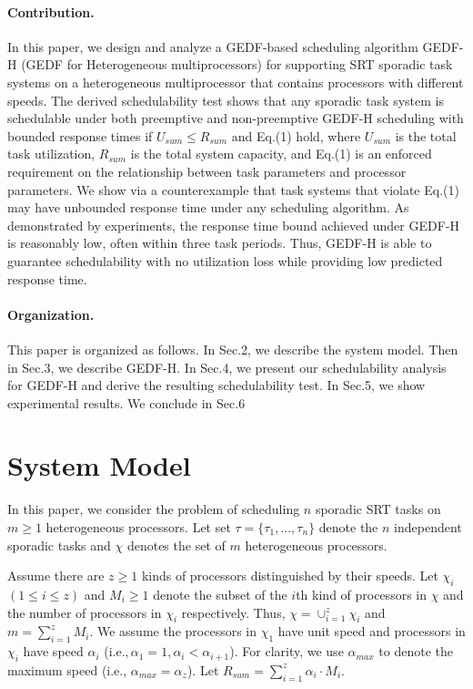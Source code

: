 \documentclass[Times, 10pt,twocolumn]{article}
\theoremstyle{definition}
\begin{document}
\paragraph{Contribution.} 
In this paper, we design and analyze a GEDF-based scheduling algorithm GEDF-H (GEDF for Heterogeneous multiprocessors) for supporting SRT sporadic task systems on a heterogeneous multiprocessor that contains processors with different speeds. The derived schedulability test shows that any sporadic task system is schedulable under both preemptive and non-preemptive GEDF-H scheduling with bounded response times if $U_{sum} \leq R_{sum}$ and Eq.(1) hold, where $U_{sum}$ is the total task utilization, $R_{sum}$ is the total system capacity, and Eq.(1) is an enforced requirement on the relationship between task parameters and processor parameters. We show via a counterexample that task systems that violate Eq.(1) may have unbounded response time under any scheduling algorithm. As demonstrated by experiments, the response time bound achieved under GEDF-H is reasonably low, often within three task periods. Thus, GEDF-H is able to guarantee schedulability with no utilization loss while providing low predicted response time.



\paragraph{Organization.} This paper is organized as follows. In Sec.2, we describe the system model. Then in Sec.3, we describe GEDF-H. In Sec.4, we present our schedulability analysis for GEDF-H and derive the resulting schedulability test. In Sec.5, we show experimental results. We conclude in Sec.6



\section{System Model}
\label{sec:model}

In this paper, we consider the problem of scheduling $n$ sporadic SRT tasks on $m \geq 1$ heterogeneous processors. Let set $\tau=\lbrace \tau_1,...,\tau_n \rbrace$ denote the $n$ independent sporadic tasks and $\chi$ denotes the set of $m$ heterogeneous processors.

Assume there are $z\geq 1$ kinds of processors distinguished by their speeds. Let $\chi_{i}$ $( 1\leq i\leq z)$ and $M_{i}\geq 1$ denote the subset of the $i$th kind of processors in $\chi$ and the number of processors in $\chi_{i}$ respectively. Thus, $\chi=\cup_{i=1}^{z}\chi_{i}$ and $m=\sum_{i=1}^{z}M_{i}$. We assume the processors in $\chi_{1}$ have unit speed and processors in $\chi_{i}$ have speed $\alpha_{i}$ (i.e.$, \alpha_{1}=1, \alpha_{i} < \alpha_{i+1}$). For clarity, we use $\alpha_{max}$ to denote the maximum speed (i.e., $\alpha_{max}=\alpha_z$). Let $R_{sum}= \sum_{i=1}^{z}\alpha_{i} \cdot M_{i}$. 
\end{document}

